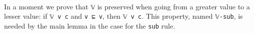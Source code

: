 \begin{fence}
\begin{code}%
\>[0]%
\>[797I]\AgdaSymbol{:}\AgdaSpace{}%
\AgdaSpace{}%
\AgdaSpace{}%
\AgdaSymbol{\}}\<%
\\
\>[.][@{}l@{}]\<[797I]%
\>[9]%
\>[801I]\AgdaSpace{}%
\AgdaSpace{}%
\AgdaSpace{}%
\AgdaSpace{}%
\AgdaSpace{}%
\AgdaSpace{}%
\<%
\\
\>[.][@{}l@{}]\<[801I]%
\>[11]\AgdaComment{---------------}\<%
\\
%
\>[9]\AgdaSpace{}%
\AgdaSpace{}%
\AgdaSymbol{(}\AgdaSpace{}%
\AgdaSpace{}%
\AgdaSymbol{)}\AgdaSpace{}%
\<%
\\
\>[0]\AgdaSpace{}%
\AgdaSymbol{\{}\AgdaSpace{}%
\AgdaSymbol{(}\AgdaSpace{}%
\AgdaSymbol{)}\AgdaSpace{}%
\AgdaSymbol{\}}\AgdaSpace{}%
\AgdaSymbol{()}\AgdaSpace{}%
\<%
\\
\>[0]\AgdaSpace{}%
\AgdaSymbol{\{}\AgdaSpace{}%
\AgdaSymbol{(}\AgdaSpace{}%
\AgdaSymbol{)}\AgdaSpace{}%
\AgdaSymbol{\}}\AgdaSpace{}%
\AgdaSpace{}%
\AgdaSpace{}%
\AgdaSymbol{=}\AgdaSpace{}%
\AgdaSpace{}%
\AgdaSpace{}%
\AgdaOperator{\AgdaInductiveConstructor{,}}\AgdaSpace{}%
\AgdaSpace{}%
\<%
\\
\>[0]\AgdaSpace{}%
\AgdaSymbol{\{}\AgdaSpace{}%
\AgdaSymbol{(}\AgdaSpace{}%
\AgdaSpace{}%
\AgdaSymbol{)}\AgdaSpace{}%
\AgdaSymbol{\}}\AgdaSpace{}%
\AgdaSymbol{()}\AgdaSpace{}%
\<%
\end{code}
\end{fence}

In a moment we prove that \texttt{𝕍} is preserved when going from a
greater value to a lesser value: if \texttt{𝕍\ v\ c} and
\texttt{v\textquotesingle{}\ ⊑\ v}, then
\texttt{𝕍\ v\textquotesingle{}\ c}. This property, named \texttt{𝕍-sub},
is needed by the main lemma in the case for the \texttt{sub} rule.


